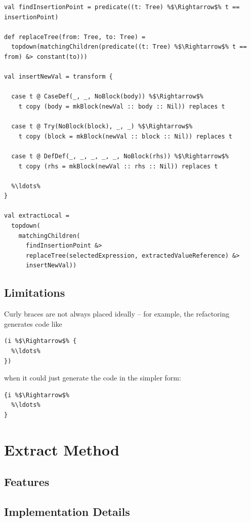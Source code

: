 \documentclass[10pt,a4paper,oneside]{scrreprt}
\begin{document}
\begin{lstlisting}
val findInsertionPoint = predicate((t: Tree) %$\Rightarrow$% t == insertionPoint)

def replaceTree(from: Tree, to: Tree) = 
  topdown(matchingChildren(predicate((t: Tree) %$\Rightarrow$% t == from) &> constant(to)))

val insertNewVal = transform {

  case t @ CaseDef(_, _, NoBlock(body)) %$\Rightarrow$%
    t copy (body = mkBlock(newVal :: body :: Nil)) replaces t
    
  case t @ Try(NoBlock(block), _, _) %$\Rightarrow$%
    t copy (block = mkBlock(newVal :: block :: Nil)) replaces t
    
  case t @ DefDef(_, _, _, _, _, NoBlock(rhs)) %$\Rightarrow$%
    t copy (rhs = mkBlock(newVal :: rhs :: Nil)) replaces t
    
  %\ldots%
}

val extractLocal = 
  topdown(
    matchingChildren(
      findInsertionPoint &> 
      replaceTree(selectedExpression, extractedValueReference) &>
      insertNewVal))
\end{lstlisting}

\subsection{Limitations}

Curly braces are not always placed ideally -- for example, the refactoring generates code like 

\begin{lstlisting}
(i %$\Rightarrow$% {
  %\ldots%
})
\end{lstlisting}

when it could just generate the code in the simpler form:

\begin{lstlisting}
{i %$\Rightarrow$%
  %\ldots%
}
\end{lstlisting}

\section{Extract Method}



\subsection{Features}
\subsection{Implementation Details}
\end{document}
